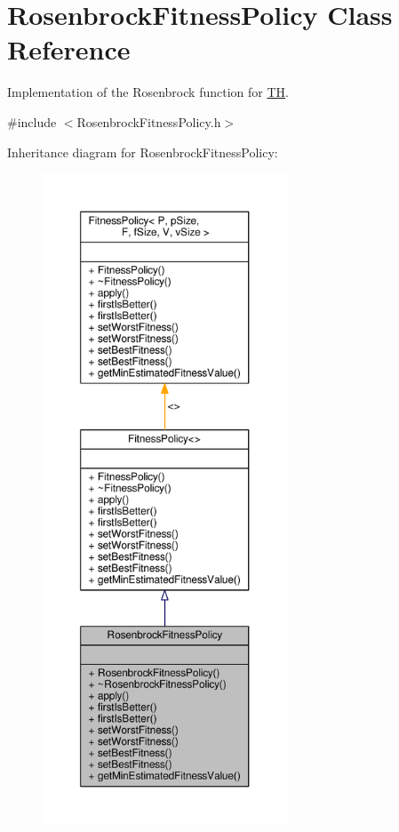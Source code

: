 \hypertarget{classRosenbrockFitnessPolicy}{}\section{Rosenbrock\+Fitness\+Policy Class Reference}
\label{classRosenbrockFitnessPolicy}


Implementation of the Rosenbrock function for \hyperlink{classTH}{TH}.  




{\ttfamily \#include $<$Rosenbrock\+Fitness\+Policy.\+h$>$}



Inheritance diagram for Rosenbrock\+Fitness\+Policy\+:\nopagebreak
\begin{figure}[H]
\begin{center}
\leavevmode
\includegraphics[height=550pt]{classRosenbrockFitnessPolicy__inherit__graph}
\end{center}
\end{figure}


